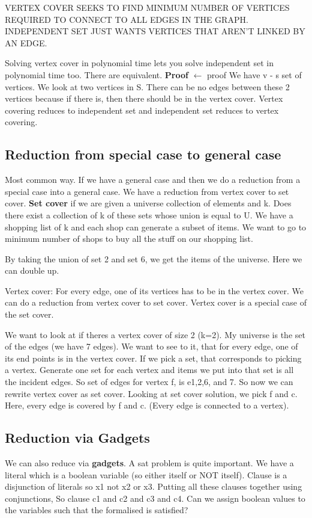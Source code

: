 \documentclass[11pt, oneside]{article}
\theoremstyle{definition}
\begin{document}
VERTEX COVER SEEKS TO FIND MINIMUM NUMBER OF VERTICES REQUIRED TO CONNECT TO ALL EDGES IN THE GRAPH. INDEPENDENT SET JUST WANTS VERTICES THAT AREN'T LINKED BY AN EDGE.

Solving vertex cover in polynomial time lets you solve independent set in polynomial time too. There are equivalent.
\textbf{Proof}
$\leftarrow$ proof
We have v - s set of vertices. We look at two vertices in S. There can be no edges between these 2 vertices because if there is, then there should be in the vertex cover.
Vertex covering reduces to independent set and independent set reduces to vertex covering.

\subsection{Reduction from special case to general case}
Most common way. If we have a general case and then we do a reduction from a special case into a general case. We have a reduction from vertex cover to set cover. \textbf{Set cover} if we are given a universe collection of elements and k. Does there exist a collection of k of these sets whose union is equal to U. We have a shopping list of k and each shop can generate a subset of items. We want to go to minimum number of shops to buy all the stuff on our shopping list.

By taking the union of set 2 and set 6, we get the items of the universe. Here we can double up.

Vertex cover: For every edge, one of its vertices has to be in the vertex cover. We can do a reduction from vertex cover to set cover. Vertex cover is a special case of the set cover.

We want to look at if theres a vertex cover of size 2 (k=2). My universe is the set of the edges (we have 7 edges). We want to see to it, that for every edge, one of its end points is in the vertex cover. If we pick a set, that corresponds to picking a vertex. Generate one set for each vertex and items we put into that set is all the incident edges. So set of edges for vertex f, is e1,2,6, and 7. So now we can rewrite vertex cover as set cover. Looking at set cover solution, we pick f and c. Here, every edge is covered by f and c. (Every edge is connected to a vertex).

\subsection{Reduction via Gadgets}
We can also reduce via \textbf{gadgets}. A sat problem is quite important. We have a literal which is a boolean variable (so either itself or NOT itself). Clause is a disjunction of literals so x1 not x2 or x3. Putting all these clauses together using conjunctions, So clause c1 and c2 and c3 and c4. Can we assign boolean values to the variables such that the formalised is satisfied?
\end{document}
